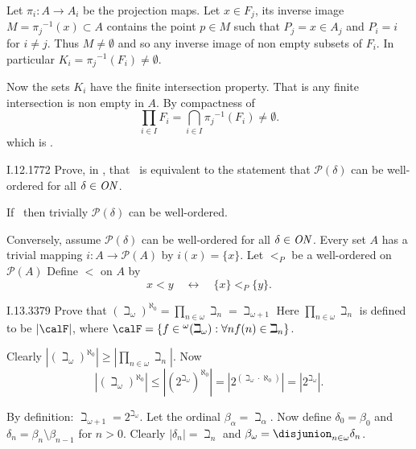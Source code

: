 Let \(\pi_i: A \to A_i\) be the projection maps.
Let \(x \in F_j\), its inverse image \(M = {\pi_j}^{-1}(x) \subset A\)
contains the point \(p\in M\)
such that \(P_j = x \in A_j\) and \(P_i = i\) for \(i \neq j\).
Thus \(M\neq \emptyset\) and so any inverse image of non empty
subsets of \(F_i\). In particular \(K_i = {\pi_j}^{-1}(F_i) \neq \emptyset\).

Now the sets \(K_i\) have the finite intersection property.
That is any finite intersection is non empty in $A$.
By compactness of
\begin{equation*}
\prod_{i\in I} F_i = \bigcap_{i\in I} {\pi_j}^{-1}(F_i) \neq \emptyset.
\end{equation*}
which is \AC.

\begin{lexcopy}{I.12.17}{72}
Prove, in \ZF, that \AC\ is equivalent to the statement that
\(\mathcal{P}(\delta)\) can be well-ordered
for all \(\delta \in \mathit{ON}\).
\end{lexcopy}
If \AC\ then trivially \(\mathcal{P}(\delta)\) can be well-ordered.

Conversely, assume \(\mathcal{P}(\delta)\) can be well-ordered
for all \(\delta \in \mathit{ON}\).
Every set $A$ has a trivial mapping \(i: A \to \mathcal{P}(A)\)
by \(i(x) = \{x\}\).
Let \(<_P\) be a well-ordered on \(\mathcal{P}(A)\)
Define \(<\) on $A$ by
\begin{equation*}
x < y \quad \leftrightarrow \quad \{x\} <_P \{y\}.
\end{equation*}

\begin{lexcopy}{I.13.33}{79}
Prove that
\((\beth_\omega)^{\aleph_0} = \prod_{n\in\omega}\beth_n = \beth_{\omega + 1}\)
Here \(\prod_{n\in\omega}\beth_n\)
is defined to be
\(|\calF|\), where
\(\calF = \{f \in {}^\omega(\beth_\omega): \forall n f(n) \in \beth_n\}\).
\end{lexcopy}

Clearly
\(\left|(\beth_\omega)^{\aleph_0}\right| \geq \left|\prod_{n\in\omega}\beth_n\right|\).
Now
\begin{equation*}
\left|(\beth_\omega)^{\aleph_0}\right|
\leq \left|\left(2^{\beth_\omega}\right)^{\aleph_0}\right|
= \left|2^{(\beth_\omega\cdot\aleph_0)}\right|
= \left|2^{\beth_\omega}\right|.
\end{equation*}

By definition: \(\beth_{\omega + 1} =  2^{\beth_\omega}\).
Let the ordinal \(\beta_\alpha = \beth_\alpha\). Now define \(\delta_0 = \beta_0\)
and \(\delta_n = \beta_n \setminus \beta_{n - 1}\) for \(n > 0\).
Clearly
\(|\delta_n| = \beth_n\) and
\(\beta_\omega = \disjunion_{n\in\omega}\delta_n\).

